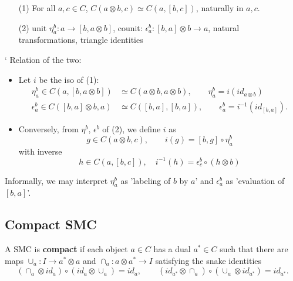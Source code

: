 \documentclass[12pt]{article}
\theoremstyle{definition}
\theoremstyle{remark}
\begin{document}
\begin{enumerate}
\item[(1)] For all $a,c\in C$, $C(a\otimes b,c)\simeq C(a,[b,c])$, naturally in $a,c$.
\item[(2)] unit $\eta^b_a: a\to [b,a\otimes b]$, counit: $\epsilon^b_a: [b,a]\otimes
b\to a$, natural transformations, triangle identities
\end{enumerate}
`
Relation of the two: 
\begin{itemize}
\item Let $i$ be the iso of (1): 
\begin{align*}
\eta^b_a\in C(a,[b,a\otimes b])&\simeq C(a\otimes b,a\otimes b),\qquad
\eta^b_a=i(id_{a\otimes b})\\
\epsilon^b_a\in C([b,a]\otimes b,a)&\simeq C([b,a],[b,a]),\qquad \epsilon^b_a=i^{-1}(id_{[b,a]}).
\end{align*}
\item Conversely, from $\eta^b$, $\epsilon^b$ of (2), we define $i$ as 
\[
g\in C(a\otimes b,c),\qquad i(g)=[b,g]\circ \eta^b_a
\]
with inverse
\[
h\in C(a,[b,c]),\quad i^{-1}(h)=\epsilon^b_c\circ (h\otimes b)
\]

\end{itemize}

Informally, we may interpret $\eta^b_a$ as 'labeling of $b$ by $a$' and $\epsilon^b_a$ as 'evaluation of $[b,a]$'.

\subsection{Compact SMC}

A SMC is \textbf{compact} if each object $a\in C$ has a dual $a^*\in C$ such that there
are maps $\cup_a: I\to a^*\otimes a$ and $\cap_a: a\otimes a^*\to I$ satisfying the snake
identities
\[
(\cap_a\otimes id_a)\circ (id_a\otimes \cup_a)=id_a,\qquad (id_{a^*}\otimes
\cap_a)\circ (\cup_a\otimes id_{a^*})=id_{a^*}.
\]
\end{document}
